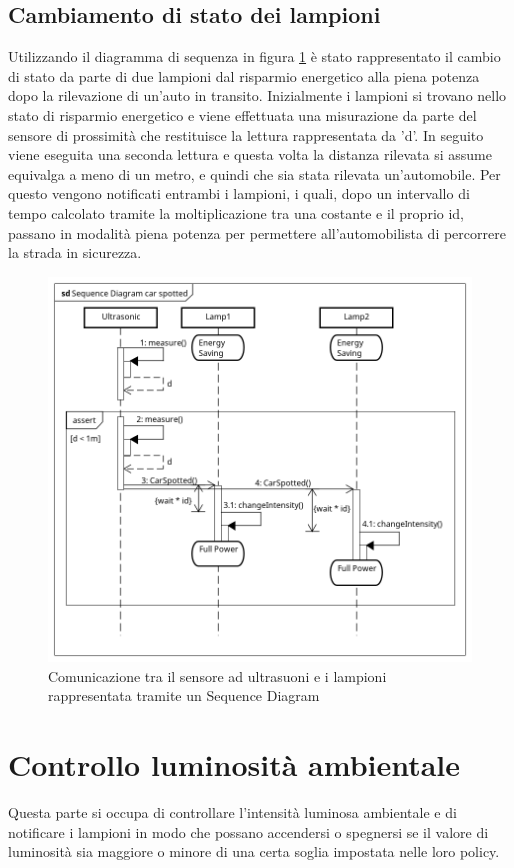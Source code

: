 \subsection{Cambiamento di stato dei lampioni}
Utilizzando il diagramma di sequenza in figura \ref{SD CAR} è stato rappresentato il cambio di stato da parte di due lampioni dal risparmio energetico alla piena potenza dopo la rilevazione di un'auto in transito.
Inizialmente i lampioni si trovano nello stato di risparmio energetico e viene effettuata una misurazione da parte del sensore di prossimità che restituisce la lettura rappresentata da 'd'.
In seguito viene eseguita una seconda lettura e questa volta la distanza rilevata si assume equivalga a meno di un metro, e quindi che sia stata rilevata un'automobile.
Per questo vengono notificati entrambi i lampioni, i quali, dopo un intervallo di tempo calcolato tramite la moltiplicazione tra una costante e il proprio id, passano in modalità piena potenza per permettere all'automobilista di percorrere la strada in sicurezza.

\begin{figure}[tbp]
	\centering
	\includegraphics[scale=.59]{figure/Sequence_Diagram_car_spotted.png}
	\caption{Comunicazione tra il sensore ad ultrasuoni e i lampioni rappresentata tramite un Sequence Diagram \label{SD CAR}}
\end{figure}

\section{Controllo luminosità ambientale}
Questa parte si occupa di controllare l'intensità luminosa ambientale e di notificare i lampioni in modo che possano accendersi o spegnersi se il valore di luminosità sia maggiore o minore di una certa soglia impostata nelle loro policy.

